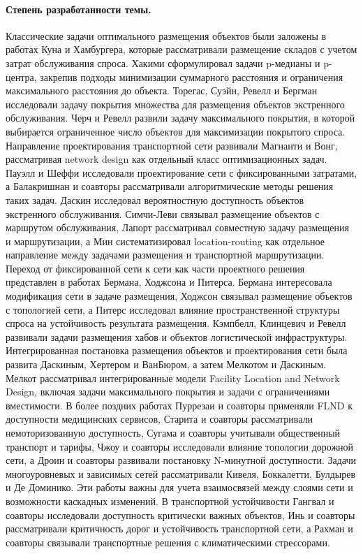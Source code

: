 \paragraph*{Степень разработанности темы.}
Классические задачи оптимального размещения объектов были заложены в работах Куна и Хамбургера, которые рассматривали размещение складов с учетом затрат обслуживания спроса. Хакими сформулировал задачи p-медианы и p-центра, закрепив подходы минимизации суммарного расстояния и ограничения максимального расстояния до объекта. Торегас, Суэйн, Ревелл и Бергман исследовали задачу покрытия множества для размещения объектов экстренного обслуживания. Черч и Ревелл развили задачу максимального покрытия, в которой выбирается ограниченное число объектов для максимизации покрытого спроса.
Направление проектирования транспортной сети развивали Магнанти и Вонг, рассматривая network design как отдельный класс оптимизационных задач. Пауэлл и Шеффи исследовали проектирование сети с фиксированными затратами, а Балакришнан и соавторы рассматривали алгоритмические методы решения таких задач. Даскин исследовал вероятностную доступность объектов экстренного обслуживания. Симчи-Леви связывал размещение объектов с маршрутом обслуживания, Лапорт рассматривал совместную задачу размещения и маршрутизации, а Мин систематизировал location-routing как отдельное направление между задачами размещения и транспортной маршрутизации.
Переход от фиксированной сети к сети как части проектного решения представлен в работах Бермана, Ходжсона и Питерса. Бермана интересовала модификация сети в задаче размещения, Ходжсон связывал размещение объектов с топологией сети, а Питерс исследовал влияние пространственной структуры спроса на устойчивость результата размещения. Кэмпбелл, Клинцевич и Ревелл развивали задачи размещения хабов и объектов логистической инфраструктуры.
Интегрированная постановка размещения объектов и проектирования сети была развита Даскиным, Хертером и ВанБюром, а затем Мелкотом и Даскиным. Мелкот рассматривал интегрированные модели Facility Location and Network Design, включая задачи максимального покрытия и задачи с ограничениями вместимости. В более поздних работах Пуррезаи и соавторы применяли FLND к доступности медицинских сервисов, Старита и соавторы рассматривали немоторизованную доступность, Сугама и соавторы учитывали общественный транспорт и тарифы, Чжоу и соавторы исследовали влияние топологии дорожной сети, а Дроин и соавторы развивали постановку N-минутной доступности.
Задачи многоуровневых и зависимых сетей рассматривали Кивеля, Боккалетти, Булдырев и Де Доминико. Эти работы важны для учета взаимосвязей между слоями сети и возможности каскадных изменений. В транспортной устойчивости Гангвал и соавторы исследовали доступность критически важных объектов, Инь и соавторы рассматривали критичность дорог и устойчивость транспортной сети, а Рахман и соавторы связывали транспортные решения с климатическими стрессорами.
